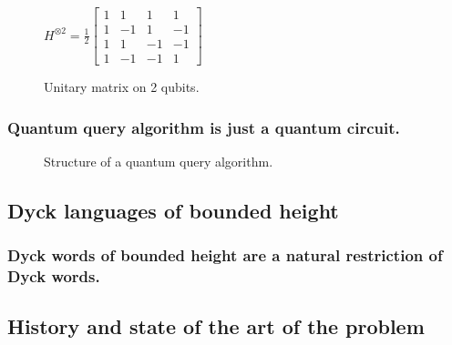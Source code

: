 \documentclass[9pt, notheorems]{beamer}
\newcommand{\Dyck}[1]{\textsc{Dyck$_{#1}$}}
\theoremstyle{definition}
\theoremstyle{plain}
\theoremstyle{definition}
\begin{document}
\begin{frame}
\begin{minipage}{.45\textwidth}
{\begin{figure}
                $H^{\otimes2} =\frac{1}{2}
                    \begin{bmatrix}
                        1 & 1  & 1  & 1  \\
                        1 & -1 & 1  & -1 \\
                        1 & 1  & -1 & -1 \\
                        1 & -1 & -1 & 1
                    \end{bmatrix}$
                \caption{Unitary matrix on 2 qubits.}
            \end{figure}}
    \end{minipage}
\end{frame}

\begin{frame}
    \frametitle{Quantum query algorithm is just a quantum circuit.}
    \begin{figure}
        \centering

        
        \caption{Structure of a quantum query algorithm.}
        \label{fig:quantum_query_algorithm_structure}
    \end{figure}
\end{frame}

\subsection{Dyck languages of bounded height}

\begin{frame}
    \frametitle{Dyck words of bounded height are a natural restriction of Dyck words.}
    \begin{figure}
        
    \end{figure}
    \visible<10>{
        {\Huge \[\Dyck{k}\]}}
\end{frame}

\subsection{History and state of the art of the problem}
\end{document}
